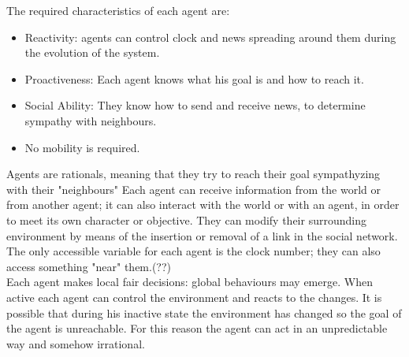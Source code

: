 \documentclass[11pt]{article} %
\begin{document}
The required characteristics of each agent are: \begin{itemize}
\item Reactivity: agents can control clock and news spreading around them during the evolution of the system.
\item Proactiveness: Each agent knows what his goal is and how to reach it.
\item Social Ability: They know how to send and receive news, to determine sympathy with neighbours.
\item No mobility is required. 

\end{itemize}

Agents are rationals, meaning that they try to reach their goal sympathyzing with their "neighbours"
Each agent can receive information from the world or from another agent; it can also interact with 
the world or with an agent, in order to meet its own character or objective.
They can  modify their surrounding environment by means of the insertion or removal of a link in the social network.
The only accessible variable for each agent is the clock number; they can also access something "near"
them.(??) 
\\

Each agent makes local fair decisions: global behaviours may emerge.
When active each agent can control the environment and reacts  to the changes. 
It is possible that during his inactive state the environment has changed so the goal of the agent is unreachable.
For this reason the agent can act in an unpredictable way and somehow irrational.
\end{document}
